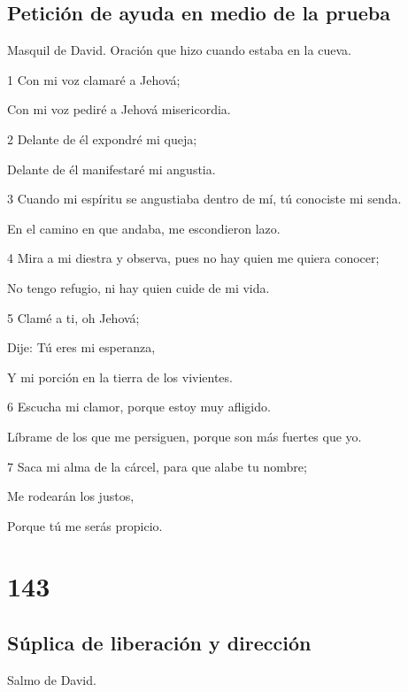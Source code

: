 \section*{Petición de ayuda en medio de la prueba}

\par Masquil de David. Oración que hizo cuando estaba en la cueva.

\par 1 Con mi voz clamaré a Jehová;
\par Con mi voz pediré a Jehová misericordia.
\par 2 Delante de él expondré mi queja;
\par Delante de él manifestaré mi angustia.
\par 3 Cuando mi espíritu se angustiaba dentro de mí, tú conociste mi senda.
\par En el camino en que andaba, me escondieron lazo.
\par 4 Mira a mi diestra y observa, pues no hay quien me quiera conocer;
\par No tengo refugio, ni hay quien cuide de mi vida.
\par 5 Clamé a ti, oh Jehová;
\par Dije: Tú eres mi esperanza,
\par Y mi porción en la tierra de los vivientes.
\par 6 Escucha mi clamor, porque estoy muy afligido.
\par Líbrame de los que me persiguen, porque son más fuertes que yo.
\par 7 Saca mi alma de la cárcel, para que alabe tu nombre;
\par Me rodearán los justos,
\par Porque tú me serás propicio.

\chapter{143}

\section*{Súplica de liberación y dirección}

\par Salmo de David.

